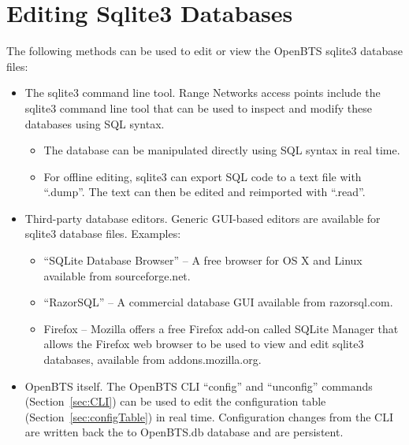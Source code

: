 \documentclass[11pt,openany]{book}
\begin{document}
\section{Editing Sqlite3 Databases}
\label{sec:sqlite3Tools}
The following methods can be used to edit or view the OpenBTS sqlite3 database files:
\begin{itemize}
	\item The sqlite3 command line tool. Range Networks access points include the sqlite3 command line tool that can be used to inspect and modify these databases using SQL syntax.
	\begin{itemize}
		\item The database can be manipulated directly using SQL syntax in real time.
		\item For offline editing, sqlite3 can export SQL code to a text file with ``.dump''.  The text can then be edited and reimported with ``.read''.
	\end{itemize}
	\item Third-party database editors.  Generic GUI-based editors are available for sqlite3 database files.  Examples:
	\begin{itemize}
		\item ``SQLite Database Browser'' -- A free browser for OS X and Linux available from sourceforge.net.
		\item ``RazorSQL'' -- A commercial database GUI available from razorsql.com.
		\item Firefox -- Mozilla offers a free Firefox add-on called SQLite Manager that allows the Firefox web browser to be used to view and edit sqlite3 databases, available from addons.mozilla.org.
	\end{itemize}
	\item OpenBTS itself.  The OpenBTS CLI ``config'' and ``unconfig'' commands (Section~\ref{sec:CLI}) can be used to edit the configuration table (Section~\ref{sec:configTable}) in real time.  Configuration changes from the CLI are written back the to OpenBTS.db database and are persistent.

\end{itemize}
\end{document}
